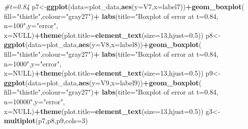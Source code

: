 \documentclass[
]{article}
\newenvironment{Shaded}{\begin{snugshade}}{\end{snugshade}}
\newcommand{\CommentTok}[1]{\textcolor[rgb]{0.56,0.35,0.01}{\textit{#1}}}
\newcommand{\DataTypeTok}[1]{\textcolor[rgb]{0.13,0.29,0.53}{#1}}
\newcommand{\DecValTok}[1]{\textcolor[rgb]{0.00,0.00,0.81}{#1}}
\newcommand{\FloatTok}[1]{\textcolor[rgb]{0.00,0.00,0.81}{#1}}
\newcommand{\KeywordTok}[1]{\textcolor[rgb]{0.13,0.29,0.53}{\textbf{#1}}}
\newcommand{\NormalTok}[1]{#1}
\newcommand{\OperatorTok}[1]{\textcolor[rgb]{0.81,0.36,0.00}{\textbf{#1}}}
\newcommand{\OtherTok}[1]{\textcolor[rgb]{0.56,0.35,0.01}{#1}}
\newcommand{\StringTok}[1]{\textcolor[rgb]{0.31,0.60,0.02}{#1}}
\begin{document}
\begin{Shaded}
\begin{Highlighting}[]
\CommentTok{#t=0.84}
\NormalTok{p7<-}\KeywordTok{ggplot}\NormalTok{(}\DataTypeTok{data=}\NormalTok{plot_data,}\KeywordTok{aes}\NormalTok{(}\DataTypeTok{y=}\NormalTok{V7,}\DataTypeTok{x=}\NormalTok{label7))}\OperatorTok{+}\KeywordTok{geom_boxplot}\NormalTok{(}
  \DataTypeTok{fill=}\StringTok{"thistle"}\NormalTok{,}\DataTypeTok{colour=}\StringTok{"gray27"}\NormalTok{)}\OperatorTok{+}
\StringTok{  }\KeywordTok{labs}\NormalTok{(}\DataTypeTok{title=}\StringTok{"Boxplot of error at t=0.84, n=100"}\NormalTok{,}\DataTypeTok{y=}\StringTok{"error"}\NormalTok{,}
       \DataTypeTok{x=}\OtherTok{NULL}\NormalTok{)}\OperatorTok{+}\KeywordTok{theme}\NormalTok{(}\DataTypeTok{plot.title=}\KeywordTok{element_text}\NormalTok{(}\DataTypeTok{size=}\DecValTok{13}\NormalTok{,}\DataTypeTok{hjust=}\FloatTok{0.5}\NormalTok{))}
\NormalTok{p8<-}\KeywordTok{ggplot}\NormalTok{(}\DataTypeTok{data=}\NormalTok{plot_data,}\KeywordTok{aes}\NormalTok{(}\DataTypeTok{y=}\NormalTok{V8,}\DataTypeTok{x=}\NormalTok{label8))}\OperatorTok{+}\KeywordTok{geom_boxplot}\NormalTok{(}
  \DataTypeTok{fill=}\StringTok{"thistle"}\NormalTok{,}\DataTypeTok{colour=}\StringTok{"gray27"}\NormalTok{)}\OperatorTok{+}
\StringTok{  }\KeywordTok{labs}\NormalTok{(}\DataTypeTok{title=}\StringTok{"Boxplot of error at t=0.84, n=1000"}\NormalTok{,}\DataTypeTok{y=}\StringTok{"error"}\NormalTok{,}
       \DataTypeTok{x=}\OtherTok{NULL}\NormalTok{)}\OperatorTok{+}\KeywordTok{theme}\NormalTok{(}\DataTypeTok{plot.title=}\KeywordTok{element_text}\NormalTok{(}\DataTypeTok{size=}\DecValTok{13}\NormalTok{,}\DataTypeTok{hjust=}\FloatTok{0.5}\NormalTok{))}
\NormalTok{p9<-}\KeywordTok{ggplot}\NormalTok{(}\DataTypeTok{data=}\NormalTok{plot_data,}\KeywordTok{aes}\NormalTok{(}\DataTypeTok{y=}\NormalTok{V9,}\DataTypeTok{x=}\NormalTok{label9))}\OperatorTok{+}\KeywordTok{geom_boxplot}\NormalTok{(}
  \DataTypeTok{fill=}\StringTok{"thistle"}\NormalTok{,}\DataTypeTok{colour=}\StringTok{"gray27"}\NormalTok{)}\OperatorTok{+}
\StringTok{  }\KeywordTok{labs}\NormalTok{(}\DataTypeTok{title=}\StringTok{"Boxplot of error at t=0.84, n=10000"}\NormalTok{,}\DataTypeTok{y=}\StringTok{"error"}\NormalTok{,}
       \DataTypeTok{x=}\OtherTok{NULL}\NormalTok{)}\OperatorTok{+}\KeywordTok{theme}\NormalTok{(}\DataTypeTok{plot.title=}\KeywordTok{element_text}\NormalTok{(}\DataTypeTok{size=}\DecValTok{13}\NormalTok{,}\DataTypeTok{hjust=}\FloatTok{0.5}\NormalTok{))}
\NormalTok{g3<-}\KeywordTok{multiplot}\NormalTok{(p7,p8,p9,}\DataTypeTok{cols=}\DecValTok{3}\NormalTok{)}


\end{Highlighting}
\end{Shaded}
\end{document}
